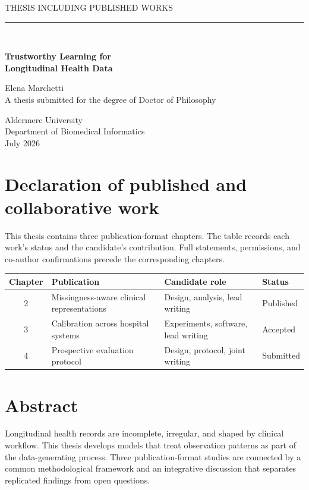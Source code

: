 \documentclass[11pt,oneside]{book}
\begin{document}
\begin{titlepage}
\centering
\vspace*{0.8in}
{\small THESIS INCLUDING PUBLISHED WORKS}\\[1em]
{\color{accent}\rule{0.8\textwidth}{1.5pt}}\\[1.2em]
{\Huge\bfseries Trustworthy Learning for\\
Longitudinal Health Data\par}
\vspace{1.2em}
{\Large Elena Marchetti}\\[0.6em]
{\large A thesis submitted for the degree of Doctor of Philosophy}

\vfill
{\large Aldermere University}\\
Department of Biomedical Informatics\\[0.5em]
July 2026
\vspace{0.7in}
\end{titlepage}

\frontmatter
\chapter*{Declaration of published and collaborative work}
This thesis contains three publication-format chapters. The table records each
work's status and the candidate's contribution. Full statements, permissions,
and co-author confirmations precede the corresponding chapters.

\begin{tabularx}{\textwidth}{@{}cXXl@{}}
\toprule
Chapter & Publication & Candidate role & Status \\
\midrule
2 & Missingness-aware clinical representations & Design, analysis, lead writing & Published \\
3 & Calibration across hospital systems & Experiments, software, lead writing & Accepted \\
4 & Prospective evaluation protocol & Design, protocol, joint writing & Submitted \\
\bottomrule
\end{tabularx}

\chapter*{Abstract}
Longitudinal health records are incomplete, irregular, and shaped by clinical
workflow. This thesis develops models that treat observation patterns as part
of the data-generating process. Three publication-format studies are connected
by a common methodological framework and an integrative discussion that
separates replicated findings from open questions.
\end{document}
